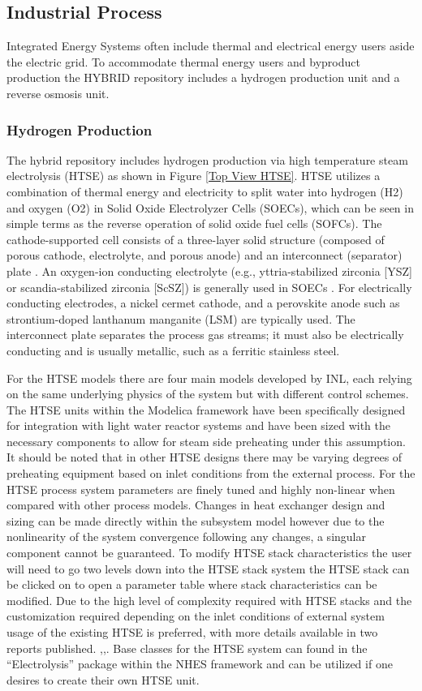 \subsection{Industrial Process}
Integrated Energy Systems often include thermal and electrical energy users aside the electric grid. To accommodate thermal energy users and byproduct production the HYBRID repository includes a hydrogen production unit and a reverse osmosis unit. 

\subsubsection{Hydrogen Production}
The hybrid repository includes hydrogen production via high temperature steam electrolysis (HTSE) as shown in Figure \ref{Top View HTSE}. HTSE utilizes a combination of thermal energy and electricity to split water into hydrogen (H2) and oxygen (O2) in Solid Oxide Electrolyzer Cells (SOECs), which can be seen in simple terms as the reverse operation of solid oxide fuel cells (SOFCs). The cathode-supported cell consists of a three-layer solid structure (composed of porous cathode, electrolyte, and porous anode) and an interconnect (separator) plate \cite{Udagawa}. An oxygen-ion conducting electrolyte (e.g., yttria-stabilized zirconia [YSZ] or scandia-stabilized zirconia [ScSZ]) is generally used in SOECs \cite{JimObrien}. For electrically conducting electrodes, a nickel cermet cathode, and a perovskite anode such as strontium-doped lanthanum manganite (LSM) are typically used. The interconnect plate separates the process gas streams; it must also be electrically conducting and is usually metallic, such as a ferritic stainless steel. 

For the HTSE models there are four main models developed by INL, each relying on the same underlying physics of the system but with different control schemes. The HTSE units within the Modelica framework have been specifically designed for integration with light water reactor systems and have been sized with the necessary components to allow for steam side preheating under this assumption. It should be noted that in other HTSE designs there may be varying degrees of preheating equipment based on inlet conditions from the external process. For the HTSE process system parameters are finely tuned and highly non-linear when compared with other process models. Changes in heat exchanger design and sizing can be made directly within the subsystem model however due to the nonlinearity of the system convergence following any changes, a singular component cannot be guaranteed. To modify HTSE stack characteristics the user will need to go two levels down into the HTSE stack system the HTSE stack can be clicked on to open a parameter table where stack characteristics can be modified. Due to the high level of complexity required with HTSE stacks and the customization required depending on the inlet conditions of external system usage of the existing HTSE is preferred, with more details available in two reports published. \cite{2016HTSE},\cite{2017HTSE},\cite{JongHydrogen}. Base classes for the HTSE system can found in the “Electrolysis” package within the NHES framework and can be utilized if one desires to create their own HTSE unit. 


